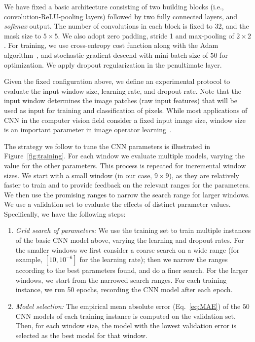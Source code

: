 \documentclass[conference]{IEEEtran}
\begin{document}
We have fixed a basic architecture consisting of two building blocks
(i.e., convolution-ReLU-pooling layers) followed by two fully connected
layers, and \textit{softmax} output. The number of convolutions in
each block is fixed to 32, and the mask size to $5 \times 5$. We also
adopt zero padding, stride 1 and max-pooling of $2\times 2$. For training, we use cross-entropy
cost function along with the Adam algorithm~\cite{Kingma:2014}, and
stochastic gradient descend with mini-batch size of $50$ for
optimization. We apply dropout regularization in the penultimate
layer.

Given the fixed configuration above, we define an experimental
protocol to evaluate the input window size, learning rate, and dropout
rate. Note that the input window determines the image patches (raw
input features) that will be used as input for training and
classification of pixels. While most applications of CNN in the
computer vision field consider a fixed input image size, window size
is an important parameter in image operator learning~\cite{2009:Nina}.

The strategy we follow to tune the CNN parameters is illustrated in 
Figure~\ref{fig:training}. For each window we evaluate multiple
models, varying the value for the other parameters. This process is
repeated for incremental window sizes. We start with a small window
(in our case, $9\times 9$), as they are relatively faster
to train and to provide feedback on the relevant ranges for the
parameters. We then use the promising ranges to narrow the search
range for larger windows. We use a validation set to evaluate the
effects of distinct parameter values. Specifically, we have the
following steps:

\begin{enumerate}
\item \emph{Grid search of parameters:} We use the training set to
  train multiple instances of the basic CNN model above, varying the
  learning and dropout rates.
  For the smaller windows we first consider a coarse search on a wide
  range (for example, $[10, 10^{-6}]$ for the learning rate); then we
  narrow the ranges according to the best parameters found, and do a
  finer search. For the larger windows, we start from the narrowed
  search ranges. For each training instance, we run 50 epochs, 
  recording the CNN model after each epoch.

\item \emph{Model selection:} The empirical mean absolute error
  (Eq.~\ref{eq:MAE}) of the $50$ CNN models of each training instance
  is computed on the validation set. Then, for each window size, the
  model with the lowest validation error is selected as the best model
  for that window.
\end{enumerate}
\end{document}
